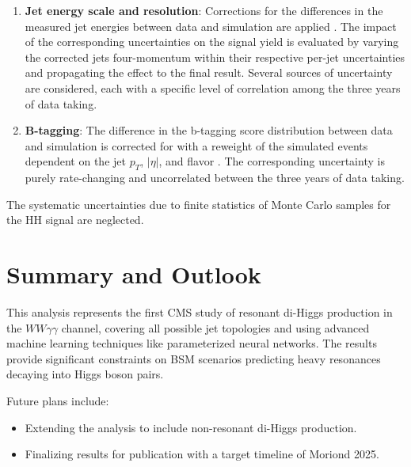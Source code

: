 \begin{enumerate}
  \item \textbf{Jet energy scale and resolution}: Corrections for the differences in the measured jet energies between data and simulation are applied \cite{Khachatryan:2016kdb}. The impact of the corresponding uncertainties on the signal yield is evaluated by varying the corrected jets four-momentum within their respective per-jet uncertainties and propagating the effect to the final result. Several sources of uncertainty are considered, each with a specific level of correlation among the three years of data taking.

  \item \textbf{B-tagging}: The difference in the b-tagging score distribution between data and simulation is corrected for with a reweight of the simulated events dependent on the jet $p_T$, $|\eta|$, and flavor \cite{Sirunyan:2017ezt}. The corresponding uncertainty is purely rate-changing and uncorrelated between the three years of data taking.





\end{enumerate}

The systematic uncertainties due to finite statistics of Monte Carlo samples for the HH signal are neglected.


\section{Summary and Outlook}
This analysis represents the first CMS study of resonant di-Higgs production in the \(WW\gamma\gamma\) channel, covering all possible jet topologies and using advanced machine learning techniques like parameterized neural networks. The results provide significant constraints on BSM scenarios predicting heavy resonances decaying into Higgs boson pairs.

Future plans include:
\begin{itemize}
    \item Extending the analysis to include non-resonant di-Higgs production.
    \item Finalizing results for publication with a target timeline of Moriond 2025.
\end{itemize}
